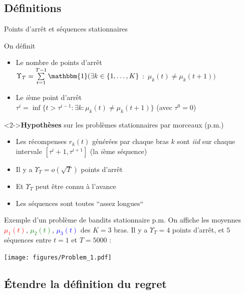 \documentclass[11pt,french,ignorenonframetext,]{beamer}
\providecommand{\tightlist}{%
  \setlength{\itemsep}{0pt}\setlength{\parskip}{0pt}}
\begin{document}
\subsection{\hfill{}Définitions\hfill{}}

\begin{frame}{Points d'arrêt et séquences stationnaires}

  On définit

  \begin{itemize}
    \item
    Le nombre de points d'arrêt\\
    $\Upsilon_T = \sum\limits_{t=1}^{T-1} \mathbbm{1}(\exists k\in \{1,\dots,K\}$ $:$ $\mu_k(t) \neq \mu_k(t+1) )$

    \item
    Le $i$ème point d'arrêt\\
    $\tau^{i} = \inf\{t > \tau^{i-1} : \exists k : \mu_k(t) \neq \mu_k(t+1)\}$
    \hfill{} (avec $\tau^0=0$)
  \end{itemize}

  \begin{block}<2->{\textbf{Hypothèses} sur les problèmes stationnaires par morceaux (p.m.)}
    \begin{itemize}\tightlist
      \item Les récompenses $r_k(t)$ générées par chaque bras $k$ sont \alert{\emph{iid} sur chaque intervale} $[ \tau^{i} + 1, \tau^{i+1} ]$ (la $i$ème séquence)
      \item Il y a $\Upsilon_T = o(\sqrt{T})$ points d'arrêt
      \item Et \alert{$\Upsilon_T$ peut être connu à l'avance}
      \item Les séquences sont toutes ``assez longues``
  \end{itemize}
\end{block}
\end{frame}


\begin{frame}[plain]{Exemple d'un problème de bandits stationnaire p.m.}
  On affiche les moyennes \textcolor{red}{$\mu_1(t)$}, \textcolor{green}{$\mu_2(t)$}, \textcolor{blue}{$\mu_3(t)$}
  des $K=3$ bras.
  Il y a $\Upsilon_T=4$ points d'arrêt, et $5$ séquences entre $t=1$ et $T=5000$ :
  \begin{center}
    \texttt{[image: figures/Problem\_1.pdf]}
  \end{center}
\end{frame}


\subsection{\hfill{}Étendre la définition du regret\hfill{}}
\end{document}
